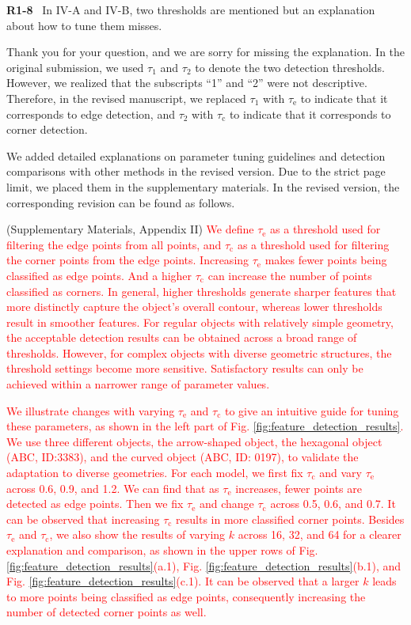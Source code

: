 \documentclass[journal]{IEEEtran}
\newcommand{\rev}[1]{\textcolor{red}{#1}}
\begin{document}
\noindent
{\textbf{\color{black}R1-8}\color{gray}~
In IV-A and IV-B, two thresholds are mentioned but an explanation about how to tune them misses.
}

Thank you for your question, and we are sorry for missing the explanation. In the original submission, we used $\tau_1$ and $\tau_2$ to denote the two detection thresholds. However, we realized that the subscripts “1” and “2” were not descriptive. Therefore, in the revised manuscript, we replaced $\tau_1$ with $\tau_\text{e}$ to indicate that it corresponds to edge detection, and $\tau_2$ with $\tau_\text{c}$ to indicate that it corresponds to corner detection.

We added detailed explanations on parameter tuning guidelines and detection comparisons with other methods in the revised version. Due to the strict page limit, we placed them in the supplementary materials. In the revised version, the corresponding revision can be found as follows.

(Supplementary Materials, Appendix II)
\rev{We define $\tau_\text{e}$ as a threshold used for filtering the edge points from all points, and $\tau_\text{c}$ as a threshold used for filtering the corner points from the edge points. Increasing $\tau_\text{e}$ makes fewer points being classified as edge points. And a higher $\tau_\text{c}$ can increase the number of points classified as corners.
In general, higher thresholds generate sharper features that more distinctly capture the object’s overall contour, whereas lower thresholds result in smoother features.
For regular objects with relatively simple geometry, the acceptable detection results can be obtained across a broad range of thresholds. However, for complex objects with diverse geometric structures, the threshold settings become more sensitive. Satisfactory results can only be achieved within a narrower range of parameter values.}

\rev{We illustrate changes with varying $\tau_\text{e}$ and $\tau_\text{c}$ to give an intuitive guide for tuning these parameters, as shown in the left part of Fig. \ref{fig:feature_detection_results}. We use three different objects, the arrow-shaped object, the hexagonal object (ABC, ID:3383), and the curved object (ABC, ID: 0197), to validate the adaptation to diverse geometries. For each model, we first fix $\tau_\text{c}$ and vary $\tau_\text{e}$ across 0.6, 0.9, and 1.2. We can find that as $\tau_\text{e}$ increases, fewer points are detected as edge points. Then we fix $\tau_\text{e}$ and change $\tau_\text{c}$ across 0.5, 0.6, and 0.7. It can be observed that increasing $\tau_\text{c}$ results in more classified corner points. 
Besides $\tau_\text{e}$ and $\tau_\text{c}$, we also show the results of varying $k$ across 16, 32, and 64 for a clearer explanation and comparison, as shown in the upper rows of Fig. \ref{fig:feature_detection_results}(a.1), Fig. \ref{fig:feature_detection_results}(b.1), and Fig. \ref{fig:feature_detection_results}(c.1). It can be observed that a larger $k$ leads to more points being classified as edge points, consequently increasing the number of detected corner points as well.}
\end{document}
